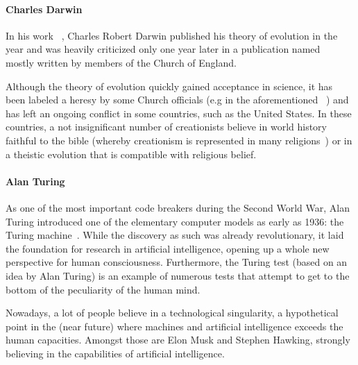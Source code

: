 \paragraph{Charles Darwin} In his work ~\cite{darwin1859origin}, Charles Robert Darwin published
 his theory of evolution in the year \citeyear{darwin1859origin} and was heavily criticized only one year later in a publication named ~\cite{temple1860essays} mostly written by members of the Church of England.

 Although the theory of evolution quickly gained acceptance in science, it has been labeled a heresy by some Church officials (e.g in the aforementioned ~\cite{temple1860essays}) and has left an ongoing conflict in some countries, such as the United States.
 In these countries, a not insignificant number of creationists believe in world history faithful to the bible (whereby creationism is represented in many religions~\cite{Hameed1637}) or in a theistic evolution that is compatible with religious belief.

\paragraph{Alan Turing} As one of the most important code breakers during the Second World War, Alan Turing introduced one of the elementary computer models as early as 1936: the Turing machine~\cite{turing1936turing}.
While the discovery as such was already revolutionary, it laid the foundation for research in artificial intelligence, opening up a whole new perspective for human consciousness.
Furthermore, the Turing test (based on an idea by Alan Turing) is an example of numerous tests that attempt to get to the bottom of the peculiarity of the human mind.

Nowadays, a lot of people believe in a technological singularity, a hypothetical point in the (near future) where machines and artificial intelligence exceeds the human capacities.
Amongst those are Elon Musk and Stephen Hawking, strongly believing in the capabilities of artificial intelligence.


